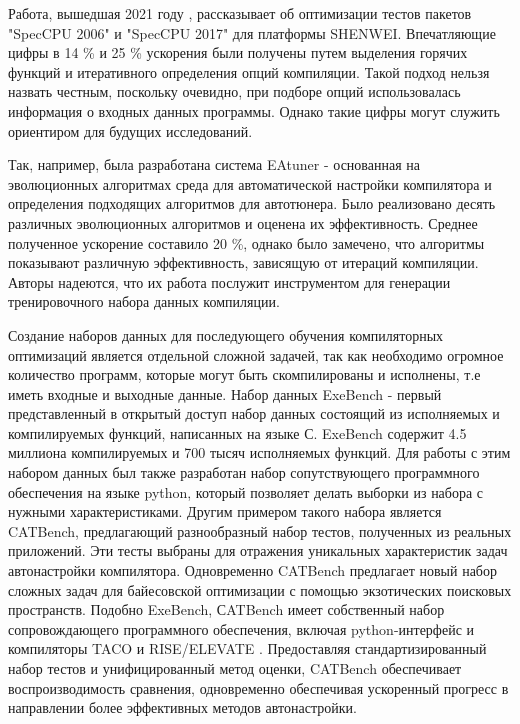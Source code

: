 Работа, вышедшая 2021 году \cite{wei2021compiler}, рассказывает об оптимизации тестов пакетов "SpecCPU 2006"\phantom{} и "SpecCPU 2017"\phantom{} для платформы SHENWEI. Впечатляющие цифры в 14 \% и 25 \% ускорения были получены путем выделения горячих функций и итеративного определения опций компиляции. Такой подход нельзя назвать честным, поскольку очевидно, при подборе опций использовалась информация о входных данных программы. Однако такие цифры могут служить ориентиром для будущих исследований. 

Так, например, была разработана система EAtuner \cite{xiao2024eatuner} -  основанная на эволюционных алгоритмах среда для автоматической настройки компилятора и определения подходящих алгоритмов для автотюнера. Было реализовано десять различных эволюционных алгоритмов и оценена их эффективность. Среднее полученное ускорение составило 20 \%, однако было замечено, что алгоритмы показывают различную эффективность, зависящую от итераций компиляции. Авторы надеются, что их работа послужит инструментом для генерации тренировочного набора данных компиляции. 

Создание наборов данных для последующего обучения компиляторных оптимизаций является отдельной сложной задачей, так как необходимо огромное количество программ, которые могут быть скомпилированы и исполнены, т.е иметь входные и выходные данные. Набор данных ExeBench \cite{armengol2022exebench}  - первый представленный в открытый доступ набор данных состоящий из исполняемых и компилируемых функций, написанных на языке С. ExeBench содержит 4.5 миллиона компилируемых и 700 тысяч исполняемых функций. Для работы с этим набором данных был также разработан набор сопутствующего программного обеспечения на языке python, который позволяет делать выборки из набора с нужными характеристиками. Другим примером такого набора является CATBench, предлагающий разнообразный набор тестов, полученных из реальных приложений.
Эти тесты выбраны для отражения уникальных характеристик задач автонастройки компилятора.
Одновременно CATBench предлагает новый набор сложных задач для байесовской оптимизации с помощью
экзотических поисковых пространств. Подобно ExeBench, СATBench имеет собственный набор сопровождающего программного обеспечения, включая python-интерфейс и компиляторы TACO \cite{kjolstad2017taco} и RISE/ELEVATE \cite{steuwer2022rise}.
Предоставляя стандартизированный набор тестов и унифицированный метод оценки, CATBench обеспечивает воспроизводимость сравнения, одновременно обеспечивая ускоренный прогресс в направлении более эффективных методов автонастройки.

